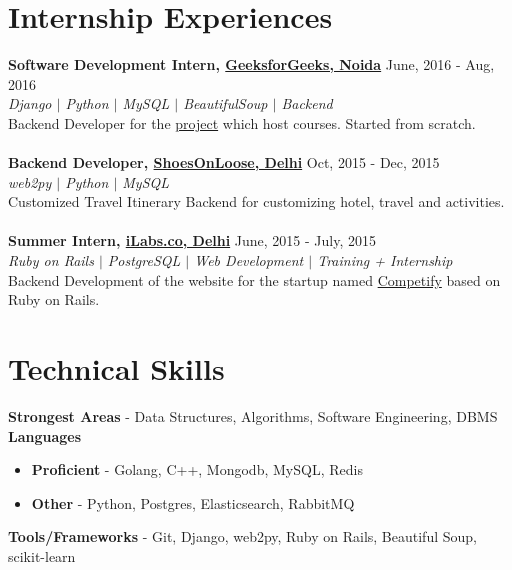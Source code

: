 \documentclass[margin, centered]{res}
\begin{document}
\begin{resume}
\section{Internship Experiences}
\textbf{Software Development Intern, \href{http://www.geeksforgeeks.org}{GeeksforGeeks, Noida}} \hfill June, 2016 - Aug, 2016\\
\emph{\color{BlueViolet}Django $\vert$ Python $\vert$ MySQL $\vert$ BeautifulSoup $\vert$ Backend}  \\
Backend Developer for the \href{http://courses.geeksforgeeks.org}{project} which host courses. Started from scratch.  \\
\\
\textbf{Backend Developer, \href {http://shoesonloose.com/}{ShoesOnLoose, Delhi}} \hfill Oct, 2015 - Dec, 2015 \\
\emph{\color{BlueViolet}web2py $\vert$ Python $\vert$ MySQL} \\
Customized Travel Itinerary Backend for customizing hotel, travel and activities. \\
\\
\textbf{Summer Intern, \href{http://www.ilabs.co}{iLabs.co, Delhi}} \hfill June, 2015 - July, 2015 \\
\emph{\color{BlueViolet}Ruby on Rails $\vert$ PostgreSQL $\vert$ Web Development $\vert$ Training + Internship} \\
Backend Development of the website for the startup named \href {http://competifyin.herokuapp.com} {Competify} based on Ruby on Rails. 
\section{Technical \hspace{2mm} Skills}
\textbf{Strongest Areas} - Data Structures, Algorithms, Software Engineering, DBMS \\
\textbf{Languages}
\begin{itemize}
	\item \textbf{Proficient} - Golang, C++, Mongodb, MySQL, Redis
	\item \textbf{Other} -  Python, Postgres, Elasticsearch, RabbitMQ
\end{itemize} 
\textbf{Tools/Frameworks} - Git, Django, web2py, Ruby on Rails, Beautiful Soup, scikit-learn


\end{resume}
\end{document}
